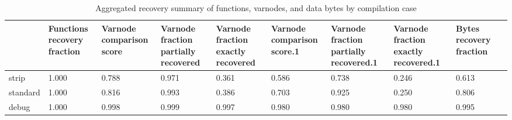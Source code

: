 \begin{table}
\centering
\caption{Aggregated recovery summary of functions, varnodes, and data bytes by compilation case}
\label{table:opts-overall-summary}
\begin{tabular}{lp{1.22cm}p{1.22cm}p{1.22cm}p{1.22cm}p{1.22cm}p{1.22cm}p{1.22cm}p{1.22cm}p{1.22cm}}
\toprule
{} &  Functions recovery fraction &  Varnode comparison score &  Varnode fraction partially recovered &  Varnode fraction exactly recovered &  Varnode comparison score.1 &  Varnode fraction partially recovered.1 &  Varnode fraction exactly recovered.1 &  Bytes recovery fraction \\
\midrule
strip    &                        1.000 &                     0.788 &                                 0.971 &                               0.361 &                       0.586 &                                   0.738 &                                 0.246 &                    0.613 \\
standard &                        1.000 &                     0.816 &                                 0.993 &                               0.386 &                       0.703 &                                   0.925 &                                 0.250 &                    0.806 \\
debug    &                        1.000 &                     0.998 &                                 0.999 &                               0.997 &                       0.980 &                                   0.980 &                                 0.980 &                    0.995 \\
\bottomrule
\end{tabular}
\end{table}
